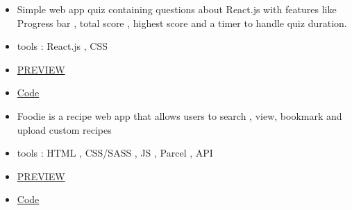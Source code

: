 \documentclass[10pt,a4paper,ragged2e,withhyper]{altacv}
\begin{document}



\makecvheader





\begin{paracol}{2}


\begin{itemize}
\item Simple web app quiz containing questions about React.js with features like Progress bar , total score , highest score and a timer to handle quiz duration.
\item tools : React.js , CSS
\item \href{https://nevo-react-quiz.vercel.app/}{\faGlobe \hspace{0.01cm} PREVIEW}
\item \href{https://github.com/iknevo/react-quiz}{\faCode \hspace{0.01cm} Code }


\end{itemize}

\divider

\begin{itemize}
\item Foodie is a recipe web app that allows users to search , view, bookmark and upload custom recipes
\item tools : HTML , CSS/SASS , JS , Parcel , API
\item \href{https://nevo-foodie.vercel.app/}{\faGlobe \hspace{0.01cm} PREVIEW}
\item \href{https://github.com/iknevo/foodie}{\faCode \hspace{0.01cm} Code }


\end{itemize}


\end{paracol}
\end{document}

